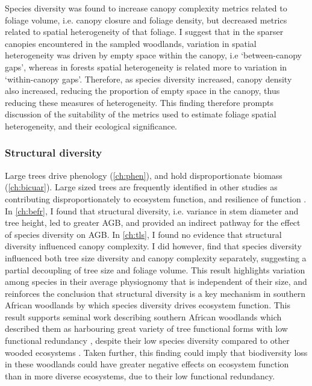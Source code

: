 \begin{refsection}
Species diversity was found to increase canopy complexity metrics related to foliage volume, i.e. canopy closure and foliage density, but decreased metrics related to spatial heterogeneity of that foliage. I suggest that in the sparser canopies encountered in the sampled woodlands, variation in spatial heterogeneity was driven by empty space within the canopy, i.e `between-canopy gaps', whereas in forests spatial heterogeneity is related more to variation in `within-canopy gaps'. Therefore, as species diversity increased, canopy density also increased, reducing the proportion of empty space in the canopy, thus reducing these measures of heterogeneity. This finding therefore prompts discussion of the suitability of the metrics used to estimate foliage spatial heterogeneity, and their ecological significance. 

\subsubsection{Structural diversity}
\label{discussion:sssec:struc}

Large trees drive phenology (\autoref{ch:phen}), and hold disproportionate biomass (\autoref{ch:bicuar}). Large sized trees are frequently identified in other studies as contributing disproportionately to ecosystem function, and resilience of function \citep{Ali2021}. In \autoref{ch:befr}, I found that structural diversity, i.e. variance in stem diameter and tree height, led to greater AGB, and provided an indirect pathway for the effect of species diversity on AGB. In \autoref{ch:tls}, I found no evidence that structural diversity influenced canopy complexity. I did however, find that species diversity influenced both tree size diversity and canopy complexity separately, suggesting a partial decoupling of tree size and foliage volume. This result highlights variation among species in their average physiognomy that is independent of their size, and reinforces the conclusion that structural diversity is a key mechanism in southern African woodlands by which species diversity drives ecosystem function. This result supports seminal work describing southern African woodlands which described them as harbouring great variety of tree functional forms with low functional redundancy \citep{}, despite their low species diversity compared to other wooded ecosystems \citep{}. Taken further, this finding could imply that biodiversity loss in these woodlands could have greater negative effects on ecosystem function than in more diverse ecosystems, due to their low functional redundancy.


\end{refsection}
